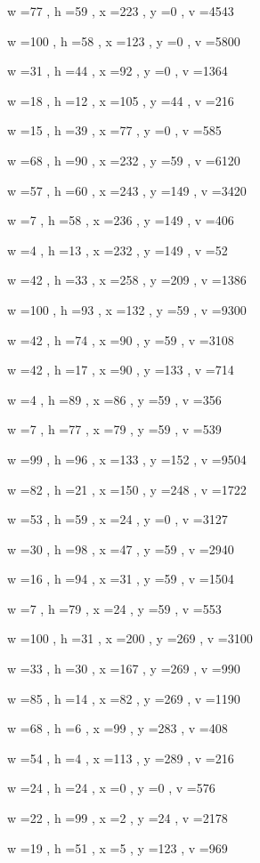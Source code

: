 \documentclass[11pt]{article}
\begin{document}
w =77 , h =59 , x =223 , y =0 , v =4543
\par
w =100 , h =58 , x =123 , y =0 , v =5800
\par
w =31 , h =44 , x =92 , y =0 , v =1364
\par
w =18 , h =12 , x =105 , y =44 , v =216
\par
w =15 , h =39 , x =77 , y =0 , v =585
\par
w =68 , h =90 , x =232 , y =59 , v =6120
\par
w =57 , h =60 , x =243 , y =149 , v =3420
\par
w =7 , h =58 , x =236 , y =149 , v =406
\par
w =4 , h =13 , x =232 , y =149 , v =52
\par
w =42 , h =33 , x =258 , y =209 , v =1386
\par
w =100 , h =93 , x =132 , y =59 , v =9300
\par
w =42 , h =74 , x =90 , y =59 , v =3108
\par
w =42 , h =17 , x =90 , y =133 , v =714
\par
w =4 , h =89 , x =86 , y =59 , v =356
\par
w =7 , h =77 , x =79 , y =59 , v =539
\par
w =99 , h =96 , x =133 , y =152 , v =9504
\par
w =82 , h =21 , x =150 , y =248 , v =1722
\par
w =53 , h =59 , x =24 , y =0 , v =3127
\par
w =30 , h =98 , x =47 , y =59 , v =2940
\par
w =16 , h =94 , x =31 , y =59 , v =1504
\par
w =7 , h =79 , x =24 , y =59 , v =553
\par
w =100 , h =31 , x =200 , y =269 , v =3100
\par
w =33 , h =30 , x =167 , y =269 , v =990
\par
w =85 , h =14 , x =82 , y =269 , v =1190
\par
w =68 , h =6 , x =99 , y =283 , v =408
\par
w =54 , h =4 , x =113 , y =289 , v =216
\par
w =24 , h =24 , x =0 , y =0 , v =576
\par
w =22 , h =99 , x =2 , y =24 , v =2178
\par
w =19 , h =51 , x =5 , y =123 , v =969
\par
\newpage
\end{document}
